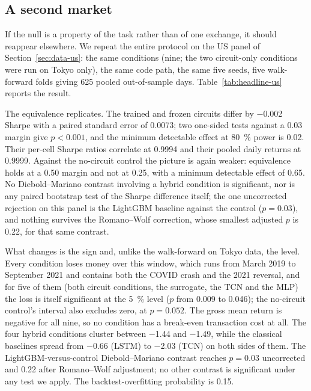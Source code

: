 \subsection{A second market}
\label{sec:results:us}

If the null is a property of the task rather than of one exchange, it should
reappear elsewhere. We repeat the entire protocol on the US panel of
Section~\ref{sec:data-us}: the same conditions (nine; the two circuit-only
conditions were run on Tokyo only), the same code path, the
same five seeds, five walk-forward folds giving \num{625} pooled out-of-sample
days. Table~\ref{tab:headline-us} reports the result.



The equivalence replicates. The trained and
frozen circuits differ by \num{-0.002} Sharpe with a paired standard error of
\num{0.0073}; two one-sided tests against a \num{0.03} margin give
$p < \num{0.001}$, and the minimum detectable effect at \SI{80}{\percent}
power is \num{0.02}. Their per-cell Sharpe ratios correlate at \num{0.9994}
and their pooled daily returns at \num{0.9999}. Against the no-circuit
control the picture is again weaker: equivalence holds at a \num{0.50} margin
and not at \num{0.25}, with a minimum detectable effect of \num{0.65}. No
Diebold--Mariano contrast involving a hybrid condition is significant, nor is
any paired bootstrap test of the Sharpe difference itself; the one uncorrected
rejection on this panel is the LightGBM baseline against the control
($p = 0.03$), and nothing survives the Romano--Wolf correction, whose smallest
adjusted $p$ is \num{0.22}, for that same contrast.

What changes is the sign and, unlike the walk-forward on Tokyo data, the level.
Every condition loses money over this window, which runs from March 2019 to
September 2021 and contains both the COVID crash and the 2021 reversal, and for
five of them (both circuit conditions, the surrogate, the TCN and the MLP)
the loss is itself significant at the \SI{5}{\percent} level ($p$ from \num{0.009} to
\num{0.046}); the no-circuit control's interval also excludes zero, at
$p = 0.052$. The gross mean
return is negative for all nine, so no condition has a break-even transaction
cost at all. The four hybrid conditions cluster between \num{-1.44} and
\num{-1.49}, while the classical baselines spread from \num{-0.66} (LSTM) to
\num{-2.03} (TCN) on both sides of them. The LightGBM-versus-control
Diebold--Mariano contrast reaches $p = 0.03$ uncorrected and \num{0.22} after
Romano--Wolf adjustment; no other contrast is significant under any test we
apply. The backtest-overfitting probability is \num{0.15}.

